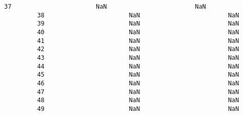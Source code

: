 \documentclass[11pt]{article}
\begin{document}
\begin{Verbatim}[commandchars=\\\{\}]
         37                       NaN                        NaN   
         38                       NaN                        NaN   
         39                       NaN                        NaN   
         40                       NaN                        NaN   
         41                       NaN                        NaN   
         42                       NaN                        NaN   
         43                       NaN                        NaN   
         44                       NaN                        NaN   
         45                       NaN                        NaN   
         46                       NaN                        NaN   
         47                       NaN                        NaN   
         48                       NaN                        NaN   
         49                       NaN                        NaN   
         

\end{Verbatim}
\end{document}
